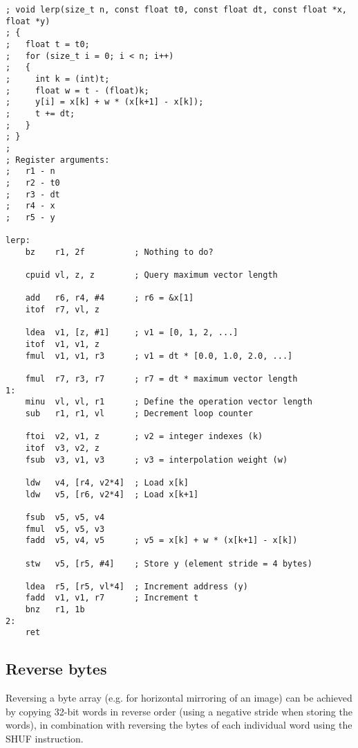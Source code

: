 \begin{lstlisting}[style=assembler]
; void lerp(size_t n, const float t0, const float dt, const float *x, float *y)
; {
;   float t = t0;
;   for (size_t i = 0; i < n; i++)
;   {
;     int k = (int)t;
;     float w = t - (float)k;
;     y[i] = x[k] + w * (x[k+1] - x[k]);
;     t += dt;
;   }
; }
;
; Register arguments:
;   r1 - n
;   r2 - t0
;   r3 - dt
;   r4 - x
;   r5 - y

lerp:
    bz    r1, 2f          ; Nothing to do?

    cpuid vl, z, z        ; Query maximum vector length

    add   r6, r4, #4      ; r6 = &x[1]
    itof  r7, vl, z

    ldea  v1, [z, #1]     ; v1 = [0, 1, 2, ...]
    itof  v1, v1, z
    fmul  v1, v1, r3      ; v1 = dt * [0.0, 1.0, 2.0, ...]

    fmul  r7, r3, r7      ; r7 = dt * maximum vector length
1:
    minu  vl, vl, r1      ; Define the operation vector length
    sub   r1, r1, vl      ; Decrement loop counter

    ftoi  v2, v1, z       ; v2 = integer indexes (k)
    itof  v3, v2, z
    fsub  v3, v1, v3      ; v3 = interpolation weight (w)

    ldw   v4, [r4, v2*4]  ; Load x[k]
    ldw   v5, [r6, v2*4]  ; Load x[k+1]

    fsub  v5, v5, v4
    fmul  v5, v5, v3
    fadd  v5, v4, v5      ; v5 = x[k] + w * (x[k+1] - x[k])

    stw   v5, [r5, #4]    ; Store y (element stride = 4 bytes)

    ldea  r5, [r5, vl*4]  ; Increment address (y)
    fadd  v1, v1, r7      ; Increment t
    bnz   r1, 1b
2:
    ret
\end{lstlisting}

\subsection{Reverse bytes}

Reversing a byte array (e.g. for horizontal mirroring of an image) can be
achieved by copying 32-bit words in reverse order (using a negative stride when
storing the words), in combination with reversing the bytes of each individual
word using the SHUF instruction.

